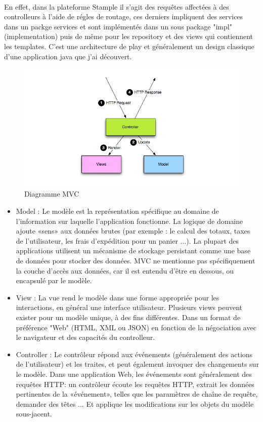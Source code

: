 \paragraph{}
En effet, dans la plateforme Stample il s'agit des requêtes affectées à des controlleurs à l'aide de régles de routage, ces derniers impliquent des services dans un packge services et sont implémentés dans un sous package "impl" (implementation) puis de même pour les repository et des views qui contiennent les templates.
C'est une architecture de play et généralement un design classique d'une application java que j'ai découvert.
\begin{figure}[H]
        \centering
                \centering
                \includegraphics[width=\textwidth]{diagrams_mvc.png}
                \caption{Diagramme MVC}
                \label{fig:Diagramme MVC}
       
\end{figure}
\begin{itemize}
\item Model : Le modèle est la représentation spécifique au domaine de l'information sur laquelle l'application fonctionne. La logique de domaine ajoute «sens» aux données brutes (par exemple : le calcul des totaux, taxes de l'utilisateur, les frais d'expédition pour un panier ...). La plupart des applications utilisent un mécanisme de stockage persistant comme une base de données pour stocker des données. MVC ne mentionne pas spécifiquement la couche d'accès aux données, car il est entendu d'être en dessous, ou encapsulé par le modèle.
\item View : La vue rend le modèle dans une forme appropriée pour les interactions, en général une interface utilisateur. Plusieurs views peuvent exister pour un modèle unique, à des fins différentes. Dans un format de préférence "Web" (HTML, XML ou JSON) en fonction de la négociation avec le navigateur et des capacités du controlleur.
\item Controller : Le contrôleur répond aux événements (généralement des actions de l'utilisateur) et les traites, et peut également invoquer des changements sur le modèle. Dans une application Web, les événements sont généralement des requêtes HTTP: un contrôleur écoute les requêtes HTTP, extrait les données pertinentes de la «événement», telles que les paramètres de chaîne de requête, demander des têtes ... Et applique les modifications sur les objets du modèle sous-jacent.

\end{itemize}

